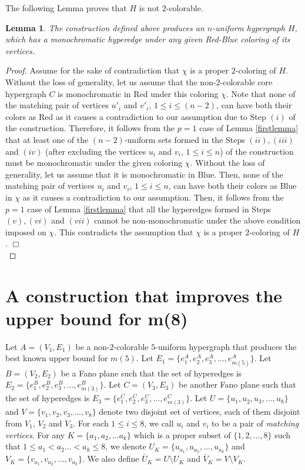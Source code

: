 \documentclass[11pt]{article}
\newtheorem{lemma}{Lemma}
\def\qed{$\Box$}
\begin{document}
\noindent The following Lemma proves that $H$ is not $2$-colorable.
\begin{lemma}
The construction defined above produces an $n$-uniform hypergraph $H$, which has a monochromatic hyperedge under any given Red-Blue coloring of its vertices.
\end{lemma}
\begin{proof}
Assume for the sake of contradiction that $\chi$ is a proper $2$-coloring of $H$. Without the loss of generality, let us assume that the non-$2$-colorable core hypergraph $C$ is monochromatic in Red under this coloring $\chi$. Note that none of the matching pair of vertices $u'_i$ and $v'_i$, $1 \leq i \leq (n-2)$, can have both their colors as Red as it causes a contradiction to our assumption due to Step $(i
)$ of the construction. Therefore, it follows from the $p=1$ case of Lemma \ref{firstlemma} that at least one of the $(n-2)$-uniform sets formed in the Steps $(ii), (iii)$ and $(iv)$ (after excluding the vertices $u_i$ and $v_i$, $1 \leq i \leq n$) of the construction must be monochromatic under the given coloring $\chi$. Without the loss of generality, let us assume that it is monochromatic in Blue. Then, none of the matching pair of vertices $u_i$ and $v_i$, $1 \leq i \leq n$, can have both their colors as Blue in $\chi$ as it causes a contradiction to our assumption. Then, it follows from the $p=1$ case of Lemma \ref{firstlemma} that all the hyperedges formed in Steps $(v), (vi)$ and $(vii)$ cannot be non-monochromatic under the above condition imposed on $\chi$. This contradicts the assumption that $\chi$ is a proper $2$-coloring of $H$. \qed\\
\end{proof}


\section{A construction that improves the upper bound for m(8)}

Let $A =(V_1, E_1)$ be a non-$2$-colorable $5$-uniform hypergraph that produces the best known upper bound for $m(5)$. Let $E_1 = \{ e^A_1, e^A_2, e^A_3, \ldots, e^A_{m(5)} \}$. Let $B =(V_2, E_2)$ be a Fano plane \cite{klein} such that the set of hyperedges is $E_2 = \{ e^B_1, e^B_2, e^B_3, \ldots, e^B_{m(3)} \}$. Let $C =(V_3, E_3)$ be another Fano plane \cite{klein} such that the set of hyperedges is $E_3 = \{ e^C_1, e^C_2, e^C_3, \ldots, e^C_{m(3)} \}$. Let $U = \{u_1, u_2, u_3, \ldots, u_8\}$ and $V = \{v_1, v_2, v_3, \ldots, v_8\}$ denote two disjoint set of vertices, each of them disjoint from $V_1$, $V_2$ and $V_3$. For each $1 \leq i \leq 8$, we call $u_i$ and $v_i$ to be a pair of {\it matching vertices}. For any $K =  \{a_1, a_2, \ldots a_k\}$ which is a proper subset of $\{1, 2, \ldots, 8\}$ such that $1 \leq a_1 < a_2 \ldots < a_k \leq 8$, we denote $U_K = \{u_{a_1}, u_{a_2}, \ldots, u_{a_k}\}$ and $V_K = \{v_{a_1}, v_{a_2}, \ldots, v_{a_k}\}$. We also define 
${\bar{U}}_K = U \setminus U_K$ and ${\bar{V}}_K = V \setminus V_K$.
\end{document}
